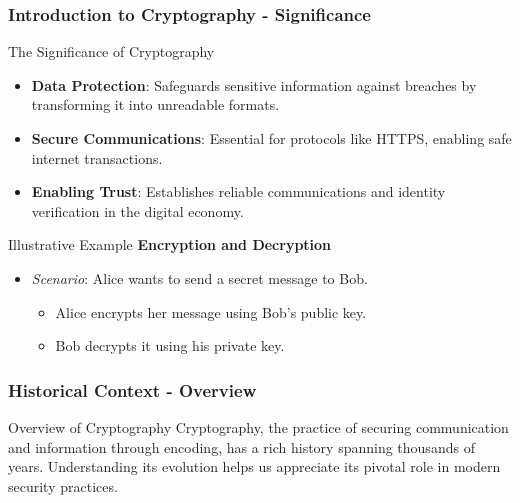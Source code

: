 \documentclass{beamer}
\begin{document}
\begin{frame}[fragile]
    \frametitle{Introduction to Cryptography - Significance}
    \begin{block}{The Significance of Cryptography}
        \begin{itemize}
            \item \textbf{Data Protection}: Safeguards sensitive information against breaches by transforming it into unreadable formats.
            \item \textbf{Secure Communications}: Essential for protocols like HTTPS, enabling safe internet transactions.
            \item \textbf{Enabling Trust}: Establishes reliable communications and identity verification in the digital economy.
        \end{itemize}
    \end{block}

    \begin{block}{Illustrative Example}
        \textbf{Encryption and Decryption}
        \begin{itemize}
            \item \textit{Scenario}: Alice wants to send a secret message to Bob.
                \begin{itemize}
                    \item Alice encrypts her message using Bob's public key.
                    \item Bob decrypts it using his private key.
                \end{itemize}
        \end{itemize}
    \end{block}
\end{frame}

\begin{frame}[fragile]
    \frametitle{Historical Context - Overview}
    \begin{block}{Overview of Cryptography}
        Cryptography, the practice of securing communication and information through encoding, has a rich history spanning thousands of years. 
        Understanding its evolution helps us appreciate its pivotal role in modern security practices.
    \end{block}
\end{frame}
\end{document}
